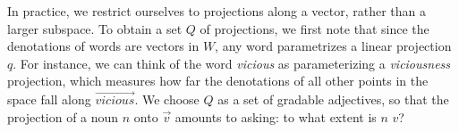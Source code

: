 \documentclass[OpenMind]{stjour}
\begin{document}


		In practice, we restrict ourselves to projections along a vector, rather than a larger subspace. 
		To obtain a set $Q$ of projections, we first note that since the denotations of words are vectors in $W$, any word parametrizes a linear projection $q$. For instance, we can think of the word \emph{vicious} as parameterizing a \emph{viciousness} projection, which measures how far the denotations of all other points in the space fall along $\overrightarrow{\mathit{vicious}}$. 
		We choose $Q$ as a set of gradable adjectives, so that the projection of a noun $n$ onto $\overrightarrow{v}$ amounts to asking: to what extent is $n$ $v$? 



\end{document}
